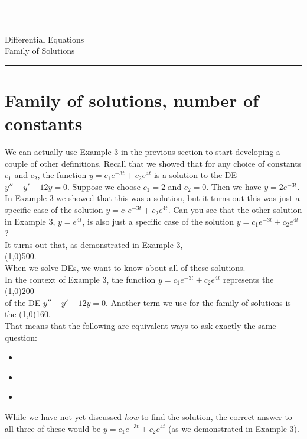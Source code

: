 \documentclass[12pt]{article}
\newcommand{\<}{\langle}
\renewcommand{\>}{\rangle}
\begin{document}
\noindent\rule{7in}{0.4pt}\\
\begin{center}
{\sc Differential Equations\\
Family of Solutions}
\end{center}
\noindent\rule{7in}{0.4pt}
\section*{Family of solutions, number of constants}
\doublespacing

\noindent  We can actually use Example 3 in the previous section to start developing a couple of 
other definitions.  Recall that we showed that for any choice of constants $c_1$ and $c_2$, the function
$y = c_1e^{-3t} + c_2e^{4t}$ is a solution to the DE $y'' - y' - 12y = 0.$  Suppose we choose $c_1 = 2$
and $c_2 = 0.$  Then we have $y = 2e^{-3t}$.  In Example 3 we showed that this was a solution, but 
it turns out this was just a specific case of the solution $y = c_1e^{-3t} + c_2e^{4t}$.  Can you see that 
the other solution in Example 3, $y = e^{4t}$, is also just a specific case of the solution 
$y = c_1e^{-3t} + c_2e^{4t}$?\\

\noindent  It turns out that, as demonstrated in Example 3, \\ %
\line(1,0){500}. \\ When we solve DEs, we want to know about all of these solutions.\\

\noindent In the context of Example 3, the function $y = c_1e^{-3t} + c_2e^{4t}$ represents the 
\line(1,0){200}\\ 
of the DE $y'' - y' - 12y = 0.$  Another term we use for the family of solutions is the 
\line(1,0){160}. \\
That means that the following are equivalent ways to ask exactly the same
question:
	\begin{itemize}
	\item  \mbox{}\\
	\item  \mbox{}\\
	\item  \mbox{}\\
	\end{itemize}
\noindent  While we have not yet discussed {\it how} to find the solution, the correct answer to
all three of these would be $y = c_1e^{-3t} + c_2e^{4t}$ (as we demonstrated in Example 3).
\\
\end{document}
